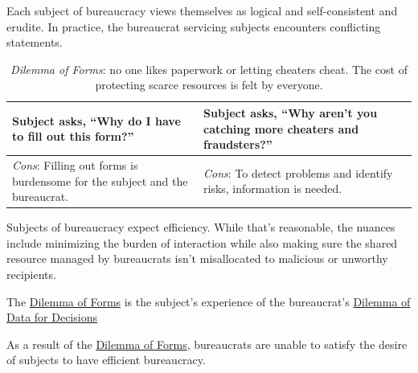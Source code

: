 Each subject of bureaucracy views themselves as logical and self-consistent and erudite. In practice, the bureaucrat servicing subjects encounters conflicting statements. 

\begin{center}
\begin{table}[H] %
\begin{tabular}{ | m{\dilemmatablewidth}| m{\dilemmatablewidth} | } 
  \hline
  \textbf{Subject asks, ``Why do I have to fill out this form?''} &
  \textbf{Subject asks, ``Why aren't you catching more cheaters and fraudsters?''} \\
  \hline
  \textit{Cons}: Filling out forms is burdensome for the subject and the bureaucrat. & 
  \textit{Cons}: To detect problems and identify risks, information is needed. \\
  \hline
\end{tabular}
\caption{\textit{Dilemma of Forms}: no one likes paperwork or letting cheaters cheat. The cost of protecting scarce resources is felt by everyone.
}
\label{table:dilemma-forms}
\end{table}
\end{center}

Subjects of bureaucracy expect efficiency. While that's reasonable, the nuances include minimizing the burden of interaction while also making sure the shared resource managed by bureaucrats isn't misallocated to malicious or unworthy recipients. 

The 
\hyperref[table:dilemma-forms]{Dilemma of Forms}
is the subject's experience of the bureaucrat's 
\hyperref[table:single-bit-decision]{Dilemma of Data for Decisions}

%
As a result of the \hyperref[table:dilemma-forms]{Dilemma of Forms}, bureaucrats are unable to satisfy the desire of subjects to have efficient bureaucracy. 



